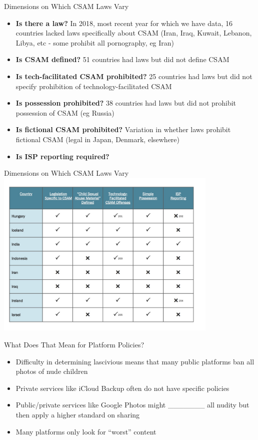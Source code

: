 \documentclass[nobackground,dvipsnames,table,aspectratio=169]{beamer}
\begin{document}
\begin{frame}{Dimensions on Which CSAM Laws Vary}
    \begin{itemize}
        \item \textbf{Is there a law?} In 2018, most recent year for which we have data, 16 countries lacked laws specifically about CSAM (Iran, Iraq, Kuwait, Lebanon, Libya, etc - some prohibit all pornography, eg Iran)
        \item \textbf{Is CSAM defined?} 51 countries had laws but did not define CSAM
        \item \textbf{Is tech-facilitated CSAM prohibited?} 25 countries had laws but did not specify prohibition of technology-facilitated CSAM
        \item \textbf{Is possession prohibited?} 38 countries had laws but did not prohibit possession of CSAM (eg Russia)
        \item \textbf{Is fictional CSAM prohibited?} Variation in whether laws prohibit fictional CSAM (legal in Japan, Denmark, elsewhere)
        \item \textbf{Is ISP reporting required?}
    \end{itemize}
\end{frame}

\begin{frame}{Dimensions on Which CSAM Laws Vary}
    \centering
    \includegraphics[width=0.8\textwidth]{varying-laws}
\end{frame}

\begin{frame}{What Does That Mean for Platform Policies?}
    \begin{itemize}
        \item Difficulty in determining lascivious means that many public platforms ban all photos of nude children
        \item Private services like iCloud Backup often do not have specific policies
        \item Public/private services like Google Photos might \_\_\_\_\_\_\_ all nudity but then apply a higher standard on sharing %
        \item Many platforms only look for “worst” content
    \end{itemize}
\end{frame}
\end{document}
